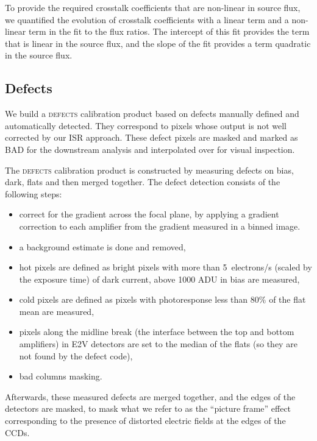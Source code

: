 To provide the required crosstalk coefficients that are non-linear in source flux, we quantified the evolution of crosstalk coefficients with a linear term and a non-linear term in the fit to the flux ratios.
The intercept of this fit provides the term that is linear in the source flux, and the slope of the fit provides a term quadratic in the source flux.

\subsection{Defects} \label{sec:processing:calibration:defects}

We build a \textsc{defects} calibration product based on defects manually defined and automatically detected.
They correspond to pixels whose output is not well corrected by our ISR approach.
These defect pixels are masked and marked as \textsc{BAD} for the downstream analysis and interpolated over for visual inspection.

The \textsc{defects} calibration product is constructed by measuring defects on bias, dark, flats and then merged together.
The defect detection consists of the following steps:
\begin{itemize}
    \item correct for the gradient across the focal plane, by applying a gradient correction to each amplifier
    from the gradient measured in a binned image.
    \item a background estimate is done and removed,
    \item hot pixels are defined as bright pixels with more than 5~electrons/s (scaled by the exposure time) of dark current, above 1000 ADU in bias are measured,
    \item cold pixels are defined as pixels with photoresponse less than $80\%$ of the flat mean are measured,
    \item pixels along the midline break (the interface between the top and bottom amplifiers) in E2V detectors are
    set to the median of the flats (so they are not found by the defect code),
    \item bad columns masking.
\end{itemize}

Afterwards, these measured defects are merged together, and the edges of the detectors are masked, to
mask what we refer to as the ``picture frame'' effect corresponding to the presence of distorted electric fields at the edges of the CCDs.

